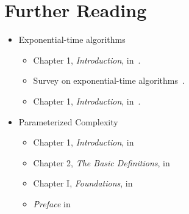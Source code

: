 %
%
%	
%


\section{Further Reading}

\begin{frame}

 \begin{itemize}
  \item Exponential-time algorithms
  \begin{itemize}
   \item Chapter 1, \emph{Introduction}, in~\cite{FominK10}.
   \item Survey on exponential-time algorithms~\cite{Woeginger01}.
   \item Chapter 1, \emph{Introduction}, in~\cite{Gaspers10}.
  \end{itemize}
  \item Parameterized Complexity
  \begin{itemize}
   \item Chapter 1, \emph{Introduction}, in~\cite{CyganFKL+15}
   \item Chapter 2, \emph{The Basic Definitions}, in~\cite{DowneyF13}
   \item Chapter I, \emph{Foundations}, in~\cite{Niedermeier06}
   \item \emph{Preface} in~\cite{FlumG06}
  \end{itemize}
 \end{itemize}

\end{frame}

\begin{frame}[t, allowframebreaks]
	\printbibliography{}
\end{frame}


% 
% 




